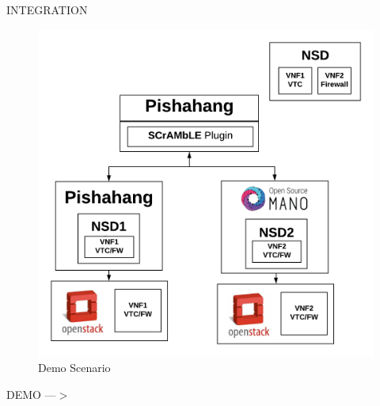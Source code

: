
\begin{frame}

\Huge{\centerline{INTEGRATION}}

\end{frame}

\begin{frame}
\begin{figure}
	\centering
	\includegraphics[width=0.8\linewidth]{images/Integration}
	\caption{Demo Scenario}
	\label{fig:integration}
\end{figure}

\end{frame}

\begin{frame}

\Huge{\centerline{DEMO ---$ > $}}

\end{frame}